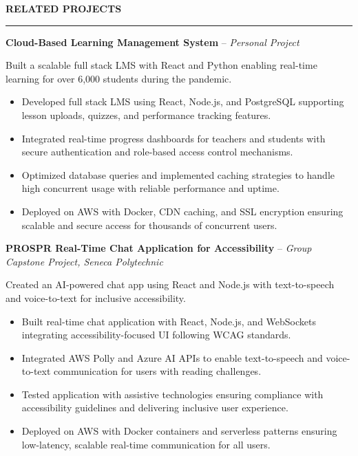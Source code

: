 \documentclass[10pt,letterpaper]{article}
\begin{document}
\vspace{6pt}

\textbf{RELATED PROJECTS}\\[-8pt]
\noindent\rule{\textwidth}{1pt}

\vspace{-2pt}

\textbf{Cloud-Based Learning Management System} -- \emph{Personal Project}

\vspace{-1pt}

Built a scalable full stack LMS with React and Python enabling real-time learning for over 6,000 students during the pandemic.
\vspace{-1pt}
\begin{itemize}
\item Developed full stack LMS using React, Node.js, and PostgreSQL supporting lesson uploads, quizzes, and performance tracking features.
\item Integrated real-time progress dashboards for teachers and students with secure authentication and role-based access control mechanisms.
\item Optimized database queries and implemented caching strategies to handle high concurrent usage with reliable performance and uptime.
\item Deployed on AWS with Docker, CDN caching, and SSL encryption ensuring scalable and secure access for thousands of concurrent users.
\end{itemize}

\textbf{PROSPR  Real-Time Chat Application for Accessibility} -- \emph{Group Capstone Project, Seneca Polytechnic}

\vspace{-1pt}

Created an AI-powered chat app using React and Node.js with text-to-speech and voice-to-text for inclusive accessibility.
\vspace{-1pt}
\begin{itemize}
\item Built real-time chat application with React, Node.js, and WebSockets integrating accessibility-focused UI following WCAG standards.
\item Integrated AWS Polly and Azure AI APIs to enable text-to-speech and voice-to-text communication for users with reading challenges.
\item Tested application with assistive technologies ensuring compliance with accessibility guidelines and delivering inclusive user experience.
\item Deployed on AWS with Docker containers and serverless patterns ensuring low-latency, scalable real-time communication for all users.
\end{itemize}
\end{document}
